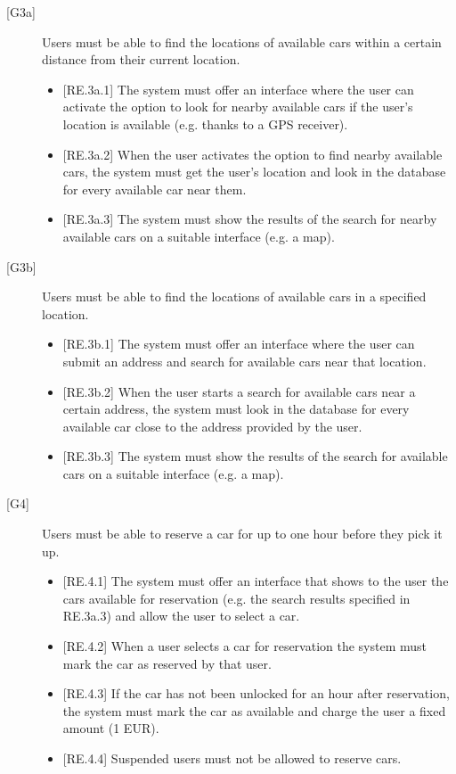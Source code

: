 \documentclass[english]{article}
\begin{document}
\begin{description}
\item[{[G3a]}]{Users must be able to find the locations of available cars within a certain distance from their current location.
\begin{itemize}
	\item{[RE.3a.1] The system must offer an interface where the user can activate the option to look for nearby available cars if the user’s location is available (e.g. thanks to a GPS receiver).}
	\item{[RE.3a.2] When the user activates the option to find nearby available cars, the system must get the user's location and look in the database for every available car near them.}
	\item{[RE.3a.3] The system must show the results of the search for nearby available cars on a suitable interface (e.g. a map).}
\end{itemize}
}

\item[{[G3b]}]{Users must be able to find the locations of available cars in a specified location.
\begin{itemize}
	\item{[RE.3b.1] The system must offer an interface where the user can submit an address and search for available cars near that location.}
	\item{[RE.3b.2] When the user starts a search for available cars near a certain address, the system must look in the database for every available car close to the address provided by the user.}
	\item{[RE.3b.3] The system must show the results of the search for available cars on a suitable interface (e.g. a map).}
\end{itemize}
}

\item[{[G4]}]{Users must be able to reserve a car for up to one hour before they pick it up.
\begin{itemize}
	\item{[RE.4.1] The system must offer an interface that shows to the user the cars available for reservation (e.g. the search results specified in RE.3a.3) and allow the user to select a car.}
	\item{[RE.4.2] When a user selects a car for reservation the system must mark the car as reserved by that user.}
	\item{[RE.4.3] If the car has not been unlocked for an hour after reservation, the system must mark the car as available and charge the user a fixed amount (1 EUR).}
	\item{[RE.4.4] Suspended users must not be allowed to reserve cars.}
\end{itemize}
}


\end{description}
\end{document}
